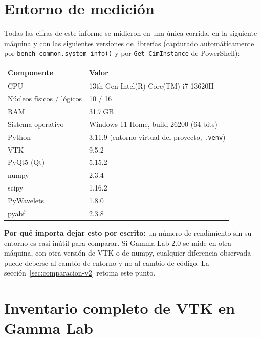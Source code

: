 \documentclass[11pt,a4paper]{article}
\begin{document}
\section{Entorno de medición}
\label{sec:entorno}

Todas las cifras de este informe se midieron en una única corrida, en la siguiente máquina y con las
siguientes versiones de librerías (capturado automáticamente por
\texttt{bench\_\allowbreak common.system\_\allowbreak info()} y por \texttt{Get-\allowbreak CimInstance} de
PowerShell):

\begin{center}
\begin{tabular}{ll}
\toprule
\textbf{Componente} & \textbf{Valor} \\
\midrule
CPU & 13th Gen Intel(R) Core(TM) i7-13620H \\
Núcleos físicos / lógicos & 10 / 16 \\
RAM & 31.7\,GB \\
Sistema operativo & Windows 11 Home, build 26200 (64 bits) \\
Python & 3.11.9 (entorno virtual del proyecto, \texttt{.venv}) \\
VTK & 9.5.2 \\
PyQt5 (Qt) & 5.15.2 \\
numpy & 2.3.4 \\
scipy & 1.16.2 \\
PyWavelets & 1.8.0 \\
pyabf & 2.3.8 \\
\bottomrule
\end{tabular}
\end{center}

\textbf{Por qué importa dejar esto por escrito:} un número de rendimiento sin su entorno es casi inútil para
comparar. Si Gamma Lab 2.0 se mide en otra máquina, con otra versión de VTK o de numpy, cualquier diferencia
observada puede deberse al cambio de entorno y no al cambio de código. La
sección~\ref{sec:comparacion-v2} retoma este punto.

\newpage
\section{Inventario completo de VTK en Gamma Lab}
\label{sec:inventario-vtk}
\end{document}

